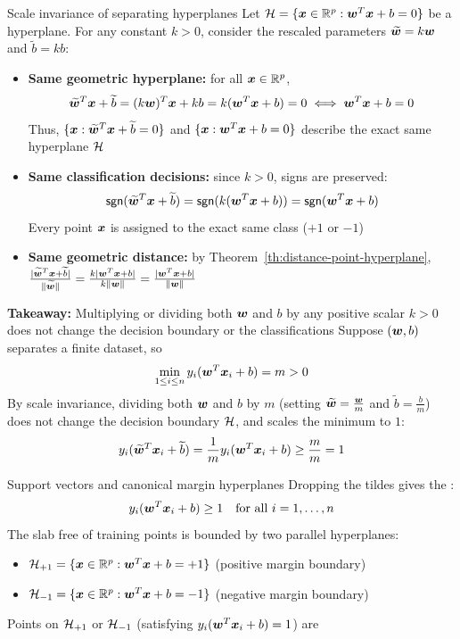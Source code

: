 \documentclass[aspectratio=169]{beamer}\usepackage[]{graphicx}\usepackage[]{xcolor}
\begin{document}
\begin{frame}{Scale invariance of separating hyperplanes}
    Let $\mathcal{H} = \{\bm{x} \in \mathbb{R}^p : \bm{w}^T \bm{x} + b = 0\}$ be a hyperplane.
    For any constant $k > 0$, consider the rescaled parameters $\widetilde{\bm{w}} = k\bm{w}$ and $\widetilde{b} = kb$:
    \begin{itemize}
        \item \textbf{Same geometric hyperplane:} for all $\bm{x} \in \mathbb{R}^p$,
        \[
            \widetilde{\bm{w}}^T \bm{x} + \widetilde{b} = (k\bm{w})^T \bm{x} + kb = k(\bm{w}^T \bm{x} + b) = 0 \iff \bm{w}^T \bm{x} + b = 0
        \]
        Thus, $\{\bm{x} : \widetilde{\bm{w}}^T \bm{x} + \widetilde{b} = 0\}$ and $\{\bm{x} : \bm{w}^T \bm{x} + b = 0\}$ describe the exact same hyperplane $\mathcal{H}$
        \item \textbf{Same classification decisions:} since $k > 0$, signs are preserved:
        \[
            \mathsf{sgn}(\widetilde{\bm{w}}^T \bm{x} + \widetilde{b}) = \mathsf{sgn}(k(\bm{w}^T \bm{x} + b)) = \mathsf{sgn}(\bm{w}^T \bm{x} + b)
        \]
        Every point $\bm{x}$ is assigned to the exact same class ($+1$ or $-1$)
        \item \textbf{Same geometric distance:} by Theorem~\ref{th:distance-point-hyperplane}, $\frac{|\widetilde{\bm{w}}^T \bm{x} + \widetilde{b}|}{\|\widetilde{\bm{w}}\|} = \frac{k|\bm{w}^T \bm{x} + b|}{k\|\bm{w}\|} = \frac{|\bm{w}^T \bm{x} + b|}{\|\bm{w}\|}$
    \end{itemize}
\end{frame}

\begin{frame}
    \textbf{Takeaway:} Multiplying or dividing both $\bm{w}$ and $b$ by any positive scalar $k > 0$ does not change the decision boundary or the classifications
    \vfill
    Suppose $(\bm{w}, b)$ separates a finite dataset, so
    \[
        \min_{1 \le i \le n} y_i(\bm{w}^T \bm{x}_i + b) = m > 0
    \]
    \vfill
    By scale invariance, dividing both $\bm{w}$ and $b$ by $m$ (setting $\widetilde{\bm{w}} = \frac{\bm{w}}{m}$ and $\widetilde{b} = \frac{b}{m}$) does not change the decision boundary $\mathcal{H}$, and scales the minimum to $1$:
    \[
        y_i(\widetilde{\bm{w}}^T \bm{x}_i + \widetilde{b}) = \frac{1}{m} y_i(\bm{w}^T \bm{x}_i + b) \ge \frac{m}{m} = 1
    \]
\end{frame}

\begin{frame}{Support vectors and canonical margin hyperplanes}
    Dropping the tildes gives the :
    \[
        y_i(\bm{w}^T \bm{x}_i + b) \ge 1 \quad \text{for all } i = 1, \ldots, n
    \]
    \vfill
    The slab free of training points is bounded by two parallel hyperplanes:
    \begin{itemize}
        \item $\mathcal{H}_{+1} = \{\bm{x} \in \mathbb{R}^p : \bm{w}^T \bm{x} + b = +1\}$ (positive margin boundary)
        \item $\mathcal{H}_{-1} = \{\bm{x} \in \mathbb{R}^p : \bm{w}^T \bm{x} + b = -1\}$ (negative margin boundary)
    \end{itemize}
    \vfill
    Points on $\mathcal{H}_{+1}$ or $\mathcal{H}_{-1}$ (satisfying $y_i(\bm{w}^T \bm{x}_i + b) = 1$) are 
\end{frame}
\end{document}
